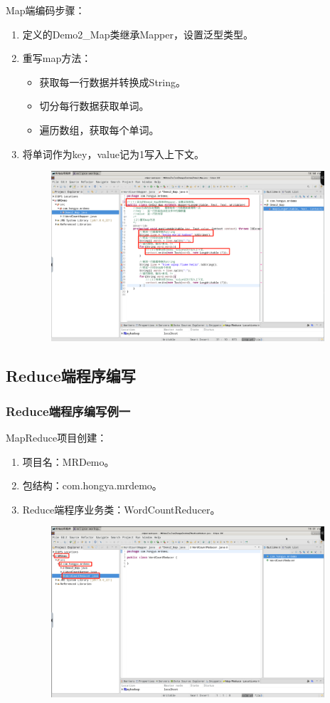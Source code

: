 \documentclass {article}
\begin{document}
				Map端编码步骤：
				\begin{enumerate}
					\item 定义的Demo2\_Map类继承Mapper，设置泛型类型。
					\item 重写map方法：
					\begin{itemize}
						\item 获取每一行数据并转换成String。
						\item 切分每行数据获取单词。
						\item 遍历数组，获取每个单词。
					\end{itemize}
					\item 将单词作为key，value记为1写入上下文。
					\begin{figure}[H]
						\centering
						\includegraphics[width=4in]{figures/fig3.png}
					\end{figure}
				\end{enumerate}
			
		\subsection{Reduce端程序编写}
			\subsubsection{Reduce端程序编写例一}
				MapReduce项目创建：
				\begin{enumerate}
					\item 项目名：MRDemo。
					\item 包结构：com.hongya.mrdemo。
					\item Reduce端程序业务类：WordCountReducer。
					\begin{figure}[H]
						\centering
						\includegraphics[width=4in]{figures/fig4.png}
					\end{figure}
				\end{enumerate}
			
\end{document}
